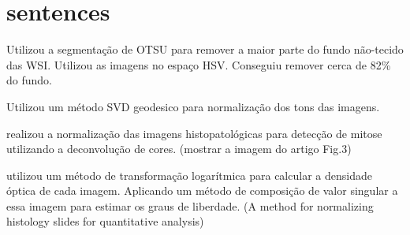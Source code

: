 \documentclass[preprint,12pt,authoryear]{elsarticle}
\begin{document}
\begin{frontmatter}












\end{frontmatter}


\section{sentences}

\cite{GUO2019} Utilizou a segmentação de OTSU para remover a maior parte do fundo não-tecido das WSI.
Utilizou as imagens no espaço HSV. Conseguiu remover cerca de 82\% do fundo.

\cite{YAN2019, DAS2019} Utilizou um método SVD geodesico para normalização dos tons das imagens.

\cite{SABEENABEEVI2019} realizou a normalização das imagens histopatológicas para detecção de mitose utilizando a deconvolução de cores. (mostrar a imagem do artigo Fig.3)

\cite{VO2019} utilizou um método de transformação logarítmica para calcular a densidade óptica de cada imagem. Aplicando um método de composição de valor singular a essa imagem para estimar os graus de liberdade. (A method for normalizing histology slides for quantitative analysis)
\end{document}
